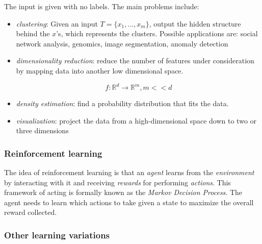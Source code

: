 \documentclass{article}
\begin{document}
The input is given with no labels. The main problems include:

\begin{itemize}
\item
  \emph{clustering}: Given an input \(T = \{x_1, ..., x_m\}\), output
  the hidden structure behind the \(x\)'s, which represents the
  clusters. Possible applications are: social network analysis,
  genomics, image segmentation, anomaly detection
\item
  \emph{dimensionality reduction}: reduce the number of features under
  consideration by mapping data into another low dimensional space.

  \[ f: \mathbb{R}^d \rightarrow \mathbb{R}^m, m << d \]
\item
  \emph{density estimation}: find a probability distribution that fits
  the data.
\item
  \emph{visualization}: project the data from a high-dimensional space
  down to two or three dimensions
\end{itemize}

\subsubsection{\texorpdfstring{\textbf{Reinforcement
learning}}{Reinforcement learning}}\label{reinforcement-learning}

The idea of reinforcement learning is that an \emph{agent} learns from
the \emph{environment} by interacting with it and receiving
\emph{rewards} for performing \emph{actions}. This framework of acting
is formally known as the \emph{Markov Decision Process}. The agent needs
to learn which actions to take given a state to maximize the overall
reward collected.

\subsubsection{Other learning
variations}\label{other-learning-variations}
\end{document}
